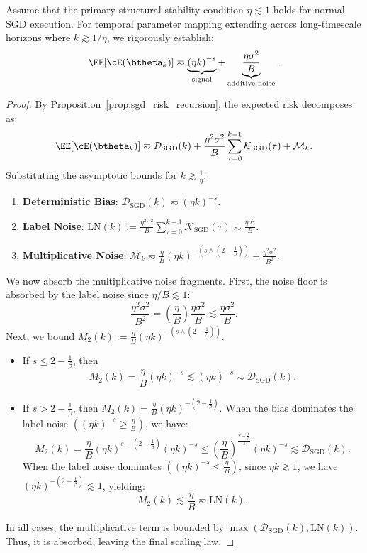 \begin{theorem}
\label{thm:sgd_scaling_law}
Assume that the primary structural stability condition \(\eta\lesssim1\) holds for normal SGD execution. For temporal parameter mapping extending across long-timescale horizons where $k \gtrsim 1/\eta$, we rigorously establish:
\begin{equation}
\label{eq:sgd loss}
\EE[\cE(\btheta_k)]
\eqsim
\underbrace{
\left(\eta k\right)^{-s}
}_{\text{signal}}
+
\underbrace{
\frac{\eta\sigma^2}{B}
}_{\text{additive noise}}.
\end{equation}
\end{theorem}
\begin{proof}
By Proposition~\ref{prop:sgd_risk_recursion}, the expected risk decomposes as:
\[
    \EE[\cE(\btheta_k)] \eqsim \mathcal{D}_{\mathrm{SGD}}(k) + \frac{\eta^2\sigma^2}{B}\sum_{\tau=0}^{k-1}\mathcal{K}_{\mathrm{SGD}}(\tau) + \mathcal{M}_k.
\]
Substituting the asymptotic bounds for $k \gtrsim \frac{1}{\eta}$:
\begin{enumerate}
    \item \textbf{Deterministic Bias}: $\mathcal{D}_{\mathrm{SGD}}(k) \eqsim (\eta k)^{-s}.$
    \item \textbf{Label Noise}: $\text{LN}(k) := \frac{\eta^2\sigma^2}{B}\sum_{\tau=0}^{k-1}\mathcal{K}_{\mathrm{SGD}}(\tau) \eqsim \frac{\eta\sigma^2}{B}.$
    \item \textbf{Multiplicative Noise}: $\mathcal{M}_k \eqsim \frac{\eta}{B} (\eta k)^{-\left(s \wedge \left(2-\frac{1}{\beta}\right)\right)} + \frac{\eta^2\sigma^2}{B^2}.$
\end{enumerate}

We now absorb the multiplicative noise fragments. First, the noise floor is absorbed by the label noise since $\eta/B \lesssim 1$:
\[
    \frac{\eta^2\sigma^2}{B^2} = \left(\frac{\eta}{B}\right) \frac{\eta\sigma^2}{B} \lesssim \frac{\eta\sigma^2}{B}.
\]
Next, we bound $M_2(k) := \frac{\eta}{B} (\eta k)^{-\left(s \wedge \left(2-\frac{1}{\beta}\right)\right)}$.
\begin{itemize}
    \item If $s \le 2-\frac{1}{\beta}$, then 
    \[
        M_2(k) = \frac{\eta}{B} (\eta k)^{-s} \lesssim (\eta k)^{-s} \eqsim \mathcal{D}_{\mathrm{SGD}}(k).
    \]
    \item If $s > 2-\frac{1}{\beta}$, then $M_2(k) = \frac{\eta}{B} (\eta k)^{-\left(2-\frac{1}{\beta}\right)}$.
    When the bias dominates the label noise $\left((\eta k)^{-s} \ge \frac{\eta}{B}\right)$, we have:
    \[
        M_2(k) = \frac{\eta}{B} (\eta k)^{s-\left(2-\frac{1}{\beta}\right)} (\eta k)^{-s} \le \left(\frac{\eta}{B}\right)^{\frac{2-\frac{1}{\beta}}{s}} (\eta k)^{-s} \lesssim \mathcal{D}_{\mathrm{SGD}}(k).
    \]
    When the label noise dominates $\left((\eta k)^{-s} \le \frac{\eta}{B}\right)$, since $\eta k \gtrsim 1$, we have $(\eta k)^{-\left(2-\frac{1}{\beta}\right)} \lesssim 1$, yielding:
    \[
        M_2(k) \lesssim \frac{\eta}{B} \eqsim \text{LN}(k).
    \]
\end{itemize}
In all cases, the multiplicative term is bounded by $\max(\mathcal{D}_{\mathrm{SGD}}(k), \text{LN}(k))$. Thus, it is absorbed, leaving the final scaling law.
\end{proof}


